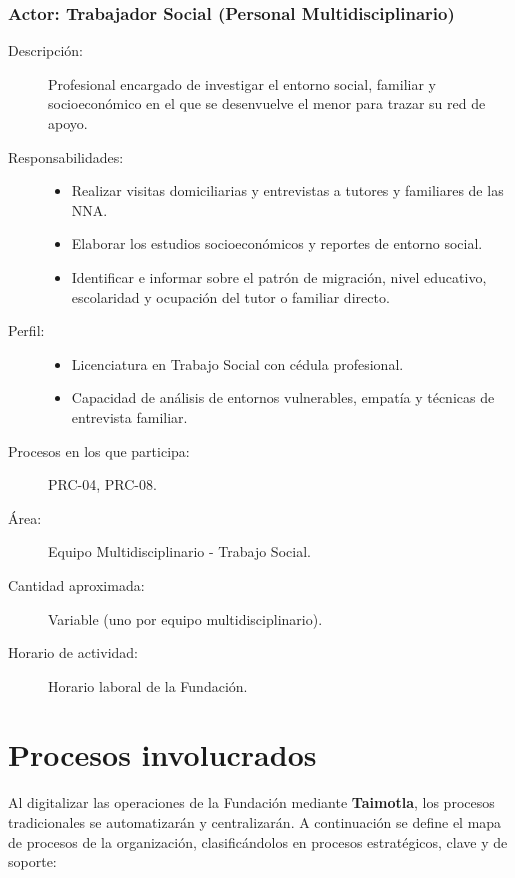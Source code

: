 \subsubsection{Actor: Trabajador Social (Personal Multidisciplinario)}
\begin{description}
	\item[Descripción:] Profesional encargado de investigar el entorno social, familiar y socioeconómico en el que se desenvuelve el menor para trazar su red de apoyo.
	\item[Responsabilidades:] \cdtEmpty
	\begin{itemize}
		\item Realizar visitas domiciliarias y entrevistas a tutores y familiares de las NNA.
		\item Elaborar los estudios socioeconómicos y reportes de entorno social.
		\item Identificar e informar sobre el patrón de migración, nivel educativo, escolaridad y ocupación del tutor o familiar directo.
	\end{itemize}
	\item[Perfil:] \cdtEmpty
	\begin{itemize}
		\item Licenciatura en Trabajo Social con cédula profesional.
		\item Capacidad de análisis de entornos vulnerables, empatía y técnicas de entrevista familiar.
	\end{itemize}
	\item[Procesos en los que participa:] PRC-04, PRC-08.
	\item[Área:] Equipo Multidisciplinario - Trabajo Social.
	\item[Cantidad aproximada:] Variable (uno por equipo multidisciplinario).
	\item[Horario de actividad:] Horario laboral de la Fundación.
\end{description}


\section{Procesos involucrados}

Al digitalizar las operaciones de la Fundación mediante \textbf{Taimotla}, los procesos tradicionales se automatizarán y centralizarán. A continuación se define el mapa de procesos de la organización, clasificándolos en procesos estratégicos, clave y de soporte:

